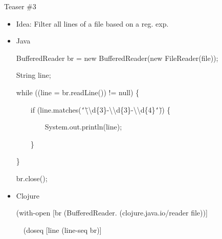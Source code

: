 \documentclass{beamer}
\renewcommand{\textquotedbl}{\texttt{\char`\"}}
\begin{document}
\begin{frame}{Teaser \#3}
  \begin{itemize}
  \item Idea: Filter all lines of a file based on a reg. exp.
  \item Java\\
\begin{small}
{\ttfamily\color{black}
%
\textcolor[rgb]{0.13333334,0.54509807,0.13333334}{BufferedReader}
\textcolor[rgb]{0.627451,0.32156864,0.1764706}{br} =
\textcolor[rgb]{0.49803922,0.0,0.49803922}{new}
\textcolor[rgb]{0.13333334,0.54509807,0.13333334}{BufferedReader}(\textcolor[rgb]{0.49803922,0.0,0.49803922}{new}
\textcolor[rgb]{0.13333334,0.54509807,0.13333334}{FileReader}(file));}

{\ttfamily\color{black}
\textcolor[rgb]{0.13333334,0.54509807,0.13333334}{String}
\textcolor[rgb]{0.627451,0.32156864,0.1764706}{line};}

{\ttfamily\color{black}
\textcolor[rgb]{0.49803922,0.0,0.49803922}{while} ((line =
br.readLine()) != \textcolor[rgb]{0.0,0.54509807,0.54509807}{null}) \{}

{\ttfamily\color{black}
\ \ \ \ \textcolor[rgb]{0.49803922,0.0,0.49803922}{if}
(line.matches(\textcolor[rgb]{0.54509807,0.13333334,0.32156864}{{\textquotedbl}{\textbackslash}{\textbackslash}d\{3\}-{\textbackslash}{\textbackslash}d\{3\}-{\textbackslash}{\textbackslash}d\{4\}{\textquotedbl}}))
\{}

{\ttfamily\color{black}
\ \ \ \ \ \ \ \ System.out.println(line);}

{\ttfamily\color{black}
\ \ \ \ \}}

{\ttfamily\color{black}
\}}

{\ttfamily\color{black}
br.close();}
\end{small}
  \item Clojure\\
\begin{small}
{\ttfamily\color{black}
%
\textcolor[rgb]{0.54901963,0.54901963,0.54901963}{(}\textcolor[rgb]{0.49803922,0.0,0.49803922}{with-open}
[br
\textcolor[rgb]{0.54901963,0.54901963,0.54901963}{(}\textcolor[rgb]{0.28235295,0.23921569,0.54509807}{BufferedReader.}
\textcolor[rgb]{0.54901963,0.54901963,0.54901963}{(}clojure.java.io/reader
file\textcolor[rgb]{0.54901963,0.54901963,0.54901963}{))}] }

{\ttfamily\color{black}
\ \ \textcolor[rgb]{0.54901963,0.54901963,0.54901963}{(}\textcolor[rgb]{0.49803922,0.0,0.49803922}{doseq}
[line
\textcolor[rgb]{0.54901963,0.54901963,0.54901963}{(}\textcolor[rgb]{0.28235295,0.23921569,0.54509807}{line-seq}
br\textcolor[rgb]{0.54901963,0.54901963,0.54901963}{)}]}


\end{small}
\end{itemize}
\end{frame}
\end{document}
